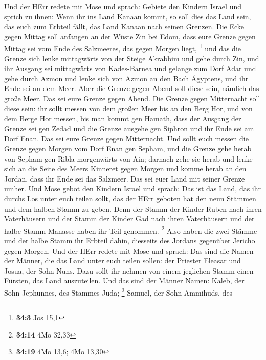  Und der HErr redete mit Mose und sprach: 
Gebiete den Kindern Israel und sprich zu ihnen: Wenn ihr ins Land Kanaan
kommt, so soll dies das Land sein, das euch zum Erbteil fällt, das Land
Kanaan nach seinen Grenzen.  Die Ecke gegen Mittag soll
anfangen an der Wüste Zin bei Edom, dass eure Grenze gegen Mittag sei
vom Ende des Salzmeeres, das gegen Morgen liegt, \footnote{\textbf{34:3}
  Jos 15,1}  und das die Grenze sich lenke mittagwärts von
der Steige Akrabbim und gehe durch Zin, und ihr Ausgang sei mittagwärts
von Kades-Barnea und gelange zum Dorf Adar und gehe durch Azmon
 und lenke sich von Azmon an den Bach Ägyptens, und ihr
Ende sei an dem Meer.  Aber die Grenze gegen Abend soll
diese sein, nämlich das große Meer. Das sei eure Grenze gegen Abend.
 Die Grenze gegen Mitternacht soll diese sein: ihr sollt
messen von dem großen Meer bis an den Berg Hor,  und von
dem Berge Hor messen, bis man kommt gen Hamath, dass der Ausgang der
Grenze sei gen Zedad  und die Grenze ausgehe gen Siphron
und ihr Ende sei am Dorf Enan. Das sei eure Grenze gegen Mitternacht.
 Und sollt euch messen die Grenze gegen Morgen vom Dorf
Enan gen Sepham,  und die Grenze gehe herab von Sepham
gen Ribla morgenwärts von Ain; darnach gehe sie herab und lenke sich an
die Seite des Meers Kinneret gegen Morgen  und komme
herab an den Jordan, dass ihr Ende sei das Salzmeer. Das sei euer Land
mit seiner Grenze umher.  Und Mose gebot den Kindern
Israel und sprach: Das ist das Land, das ihr durchs Los unter euch
teilen sollt, das der HErr geboten hat den neun Stämmen und dem halben
Stamm zu geben.  Denn der Stamm der Kinder Ruben nach
ihren Vaterhäusern und der Stamm der Kinder Gad nach ihren Vaterhäusern
und der halbe Stamm Manasse haben ihr Teil genommen. \footnote{\textbf{34:14}
  4Mo 32,33}  Also haben die zwei Stämme und der halbe
Stamm ihr Erbteil dahin, diesseits des Jordans gegenüber Jericho gegen
Morgen.  Und der HErr redete mit Mose und sprach:
 Das sind die Namen der Männer, die das Land unter euch
teilen sollen: der Priester Eleasar und Josua, der Sohn Nuns.
 Dazu sollt ihr nehmen von einem jeglichen Stamm einen
Fürsten, das Land auszuteilen.  Und das sind der Männer
Namen: Kaleb, der Sohn Jephunnes, des Stammes Juda; \footnote{\textbf{34:19}
  4Mo 13,6; 4Mo 13,30}  Samuel, der Sohn Ammihuds, des
